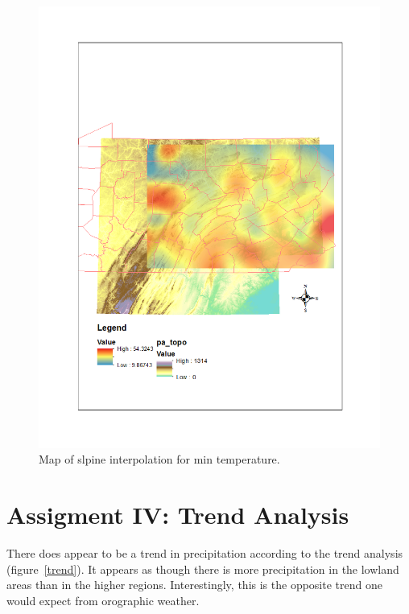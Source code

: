 \documentclass{article}\usepackage[]{graphicx}\usepackage[]{color}
\begin{document}
\begin{figure}
\includegraphics[scale=.9]{./figure/Spline_tmin}
\caption{Map of slpine interpolation for min temperature.}
\label{smin}
\end{figure}

\FloatBarrier

\section{Assigment IV: Trend Analysis}

There does appear to be a trend in precipitation according to the trend analysis (figure~\ref{trend}).  It appears as though there is more precipitation in the lowland areas than in the higher regions.  Interestingly, this is the opposite trend one would expect from orographic weather.\\
\end{document}
